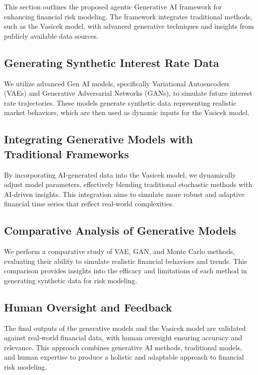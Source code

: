 \documentclass[a4paper,headinclude=on,footinclude=on,12pt,oneside]{scrbook}
\begin{document}
	
	This section outlines the proposed agentic Generative AI framework for enhancing financial risk modeling. The framework integrates traditional methods, such as the Vasicek model, with advanced generative techniques and insights from publicly available data sources.
	
	\subsection{Generating Synthetic Interest Rate Data}
	
	We utilize advanced Gen AI models, specifically Variational Autoencoders (VAEs) and Generative Adversarial Networks (GANs), to simulate future interest rate trajectories. These models generate synthetic data representing realistic market behaviors, which are then used as dynamic inputs for the Vasicek model.
	
	\subsection{Integrating Generative Models with Traditional Frameworks}
	
	By incorporating AI-generated data into the Vasicek model, we dynamically adjust model parameters, effectively blending traditional stochastic methods with AI-driven insights. This integration aims to simulate more robust and adaptive financial time series that reflect real-world complexities.
	
	\subsection{Comparative Analysis of Generative Models}
	
	We perform a comparative study of VAE, GAN, and Monte Carlo methods, evaluating their ability to simulate realistic financial behaviors and trends. This comparison provides insights into the efficacy and limitations of each method in generating synthetic data for risk modeling.
	
	\subsection{Human Oversight and Feedback}
	
	The final outputs of the generative models and the Vasicek model are validated against real-world financial data, with human oversight ensuring accuracy and relevance. This approach combines generative AI methods, traditional models, and human expertise to produce a holistic and adaptable approach to financial risk modeling.
	
\end{document}
